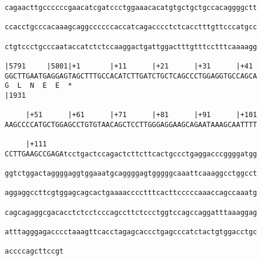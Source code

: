 \documentclass{article}
\begin{document}
\begin{Verbatim}
cagaacttgccccccgaacatcgatccctggaaacacatgtgctgctgccacaggggctt
                                                            
ccacctgcccacaaagcaggccccccaccatcagacccctctcacctttgttcccatgcc
                                                            
ctgtccctgcccaataccatctctccaaggactgattggactttgtttcctttcaaaagg
                                                            
|5791     |5801|+1       |+11      |+21      |+31      |+41 
GGCTTGAATGAGGAGTAGCTTTGCCACATCTTGATCTGCTCAGCCCTGGAGGTGCCAGCA
G  L  N  E  E  *                                            
|1931                                                       
  
     |+51      |+61      |+71      |+81      |+91      |+101
AAGCCCCATGCTGGAGCCTGTGTAACAGCTCCTTGGGAGGAAGCAGAATAAAGCAATTTT
                                                            
     |+111                                                  
CCTTGAAGCCGAGAtcctgactccagactcttcttcactgccctgaggacccggggatgg
                                                            
ggtctggactaggggaggtggaaatgcaggggagtgggggcaaattcaaaggcctggcct
                                                            
aggaggccttcgtggagcagcactgaaaacccctttcacttcccccaaaccagccaaatg
                                                            
cagcagaggcgacacctctcctcccagccttctccctggtccagccaggatttaaaggag
                                                            
atttagggagacccctaaagttcacctagagcaccctgagcccatctactgtggacctgc
                                                            
accccagcttccgt
              
              
\end{Verbatim}
\end{document}
